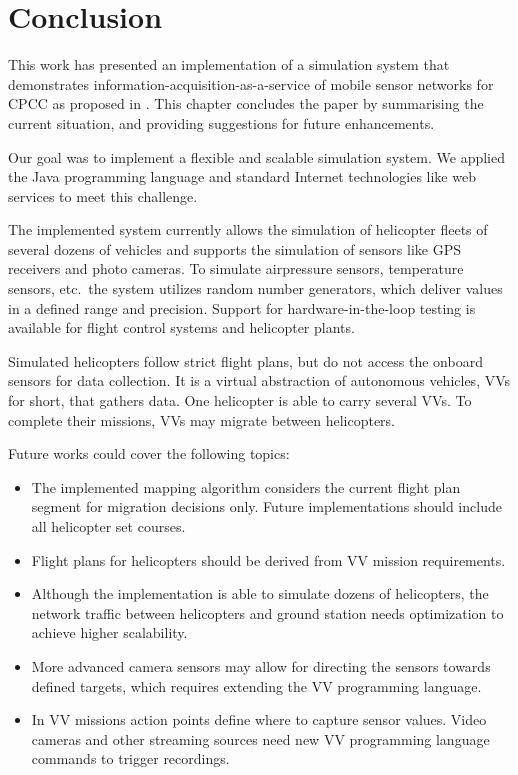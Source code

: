 
\chapter{Conclusion}

This work has presented an implementation of a simulation system that demonstrates information-acquisition-as-a-service
of mobile sensor networks for \ac{CPCC} as proposed in \cite{HotCloud10}.
%
This chapter concludes the paper by summarising the current situation, and providing suggestions for future
enhancements.

Our goal was to implement a flexible and scalable simulation system. We applied 
the Java programming language and standard Internet technologies like web services to meet this challenge.  

The implemented system currently allows the simulation of helicopter fleets of several dozens of vehicles
and supports the simulation of sensors like GPS receivers and photo cameras.
To simulate airpressure sensors, temperature sensors, etc.~the system utilizes random number generators, which
deliver values in a defined range and precision.
%
Support for hardware-in-the-loop testing is available for flight control systems and helicopter plants.
%

Simulated helicopters follow strict flight plans, but do not access the onboard sensors for data collection.
It is a virtual abstraction of autonomous vehicles, \acfp{VV} for short, that gathers data.
One helicopter is able to carry several \acp{VV}. To complete their missions, \acp{VV} may migrate between helicopters.


Future works could cover the following topics:
\begin{itemize}
  \item The implemented mapping algorithm considers the current flight plan segment for migration decisions only. Future
  	implementations should include all helicopter set courses.
   
   \item Flight plans for helicopters should be derived from \ac{VV} mission requirements. 
   
   \item Although the implementation is able to simulate dozens of helicopters, the network traffic between
   	helicopters and ground station needs optimization to achieve higher scalability.
   
   \item More advanced camera sensors may allow for directing the sensors towards defined targets, which requires
   	extending the \ac{VV} programming language.
   
   \item In \ac{VV} missions action points define where to capture sensor values. Video cameras  
   	and other streaming sources need new \ac{VV} programming language commands to trigger recordings.

\end{itemize}

